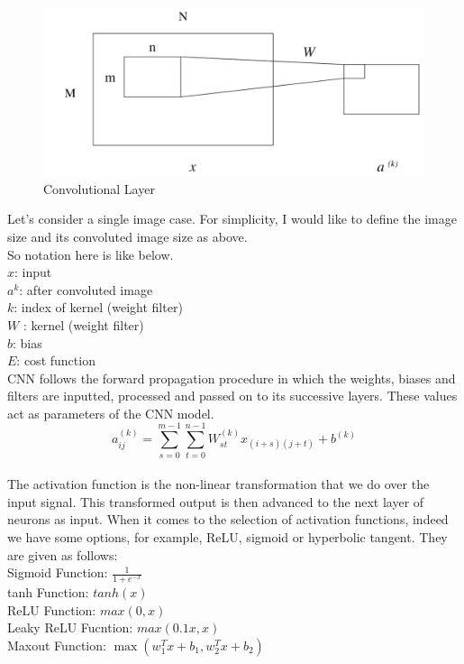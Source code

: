 \documentclass[12pt]{revtex4}
\begin{document}
\begin{figure}[htp]
    \centering
    \includegraphics[width=16cm]{CNN_Math.png}
    \caption{Convolutional Layer}
    \label{fig:abc}
\end{figure}
Let's consider a single image case. For simplicity, I would like to define the image size and its convoluted image
size as above.
\\So notation here is like below.
\\$x$: input
\\$a^{k}$: after convoluted image
\\$k$: index of kernel (weight filter)
\\$W$ : kernel (weight filter)
\\$b$: bias
\\$E$: cost function
\\CNN follows the forward propagation procedure in which the weights, biases and filters are inputted, processed and passed on to its successive layers. These values act as parameters of the CNN model. 
\begin{equation}a_{i j}^{(k)}=\sum_{s=0}^{m-1} \sum_{t=0}^{n-1} W_{s t}^{(k)} x_{(i+s)(j+t)}+b^{(k)}\end{equation}
\\The activation function is the non-linear transformation that we do over the input signal. This transformed output is then advanced to the next layer of neurons as input. When it comes to the selection of activation functions, indeed we have some options, for example, ReLU, sigmoid or hyperbolic tangent. They are given as follows: 
\\Sigmoid Function: $\frac{1}{1+e^{-x}}$
\\tanh Function: $tanh (x)$
\\ReLU Function: $max (0, x)$
\\Leaky ReLU Fucntion: $max(0.1x,x)$
\\Maxout Function: $\max \left(w_{1}^{T} x+b_{1}, w_{2}^{T} x+b_{2}\right)$
\end{document}

